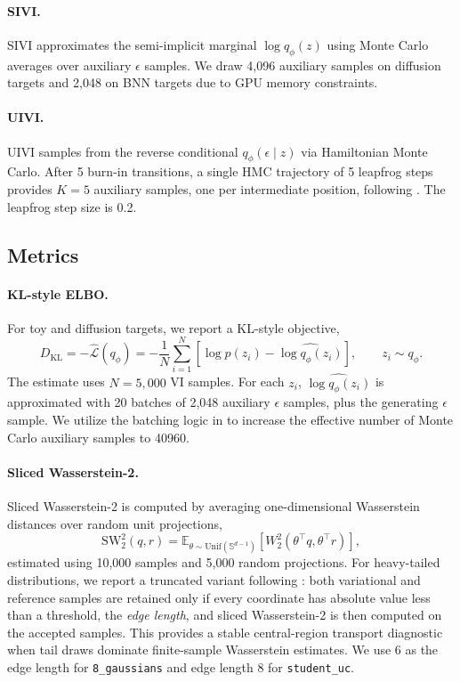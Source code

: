 \paragraph{SIVI.}
SIVI approximates the semi-implicit marginal $\log q_\phi(z)$ using Monte Carlo averages over auxiliary $\epsilon$ samples.  We draw 4,096 auxiliary samples on diffusion targets and 2,048 on BNN targets due to GPU memory constraints.

\paragraph{UIVI.}
UIVI samples from the reverse conditional $q_\phi(\epsilon \mid z)$ via Hamiltonian Monte Carlo.  After 5 burn-in transitions, a single HMC trajectory of 5 leapfrog steps provides $K=5$ auxiliary samples, one per intermediate position, following \citet{titsias2019unbiased}.  The leapfrog step size is 0.2.

\subsection{Metrics}
\label{app:metric-details}

\paragraph{KL-style ELBO.}
For toy and diffusion targets, we report a KL-style objective,
\begin{equation}
  D_{\mathrm{KL}}
  =
  -\widehat{\mathcal{L}}(q_\phi)
  =
  -\frac{1}{N}
  \sum_{i=1}^{N}
  \left[
    \log p(z_i) - \widehat{\log q_\phi(z_i)}
  \right],
  \qquad
  z_i \sim q_\phi .
\end{equation}
The estimate uses $N=5{,}000$ VI samples.  For each $z_i$, $\widehat{\log q_\phi(z_i)}$ is approximated with 20 batches of 2,048 auxiliary $\epsilon$ samples, plus the generating $\epsilon$ sample. We utilize the batching logic in \cite{pielok2025revisiting} to increase the effective number of Monte Carlo auxiliary samples to 40960.

\paragraph{Sliced Wasserstein-2.}
Sliced Wasserstein-2 is computed by averaging one-dimensional Wasserstein distances over random unit projections,
\begin{equation}
  \mathrm{SW}_2^2(q,r)
  =
  \mathbb{E}_{\theta \sim \mathrm{Unif}(\mathbb{S}^{d-1})}
  \left[
    W_2^2\!\left(\theta^\top q,\theta^\top r\right)
  \right],
\end{equation}
estimated using 10,000 samples and 5,000 random projections.  For heavy-tailed distributions, we report a truncated variant following \cite{li2023samplingmollifiedinteractionenergy}: both variational and reference samples are retained only if every coordinate has absolute value less than a threshold, the \textit{edge length}, and sliced Wasserstein-2 is then computed on the accepted samples.  This provides a stable central-region transport diagnostic when tail draws dominate finite-sample Wasserstein estimates.  We use 6 as the edge length for \texttt{8\_gaussians} and edge length 8 for \texttt{student\_uc}. 

